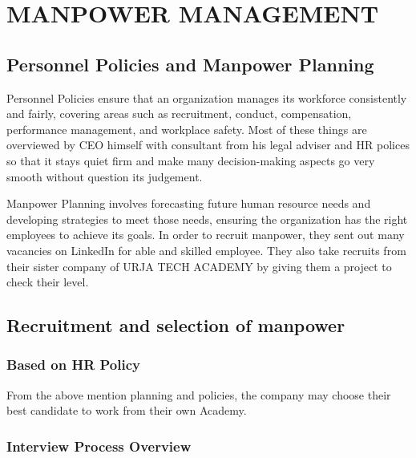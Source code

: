
\chapter{MANPOWER MANAGEMENT}

\section{Personnel Policies and  Manpower Planning}
Personnel Policies ensure that an organization manages its workforce consistently and fairly, covering areas such as recruitment, conduct, compensation, performance management, and workplace safety. Most of these things are overviewed by CEO himself with consultant from his legal adviser and HR polices so that it stays quiet firm and make many decision-making aspects go very smooth without question its judgement.

Manpower Planning involves forecasting future human resource needs and developing strategies to meet those needs, ensuring the organization has the right employees to achieve its goals. In order to recruit manpower, they sent out many vacancies on LinkedIn for able and skilled employee. They also take recruits from their sister company of URJA TECH ACADEMY by giving them a project to check their level. 

\section{Recruitment and selection of manpower}
\subsection{Based on HR Policy}

From the above mention planning and policies, the company may choose their best candidate to work from their own Academy.

\subsection{Interview Process Overview}

